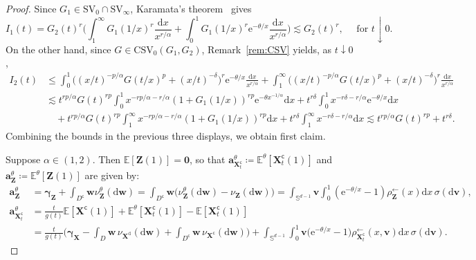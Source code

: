 \documentclass[en,oneside,bbfont,article]{amsart}
\theoremstyle{remark}
\theoremstyle{definition}
\theoremstyle{definition}
\newcommand\Sp{\mathbb{S}}
\newcommand\E{\mathds{E}}
\newcommand\e{\mathord{\mathrm{e}}}
\newcommand\1{\mathds{1}}
\newcommand\SV{\mathrm{SV}}
\newcommand\CSV{\mathrm{CSV}}
\newcommand\da{\downarrow}
\newcommand\la{\leftarrow}
\renewcommand\le{\leqslant}
\newcommand\co{\mathsf{c}}
\newcommand{\D}{\mathrm{d}}
\begin{document}
\begin{proof}
Since $G_1 \in \SV_0\cap\SV_\infty$, Karamata's theorem~\cite[Thm~1.5.11]{MR1015093} gives
\begin{equation*}
I_1(t) = G_2(t)^r\bigg(\int_1^\infty G_1(1/x)^r\frac{\D x}{x^{r/\alpha}}
+\int_0^1 G_1(1/x)^r \e^{-\theta/x} \frac{\D x}{x^{r/\alpha}}\bigg) 
\lesssim G_2(t)^r, \quad \text{ for }t \da 0.
\end{equation*}
On the other hand, since $G \in \CSV_0(G_1,G_2)$, Remark~\ref{rem:CSV} yields, as $t\da 0$,
\begin{align*}
I_2(t) &\le \int_0^1 \big((x/t)^{- p/\alpha}G(t/x)^{p}+(x/t)^{-\delta}\big)^r \e^{-\theta /x} \frac{\D x}{x^{r/\alpha}}  
+ \int_1^\infty \big((x/t)^{-p/\alpha}G(t/x)^{p}+(x/t)^{-\delta}\big)^r \frac{\D x}{x^{r/\alpha}} \\
&\lesssim t^{r p/\alpha}G(t)^{r p}\int_0^1 x^{-r p/\alpha-r/\alpha}(1+G_1(1/x))^{r p}\e^{-\theta x^{-1/\alpha}}\D x+ t^{r\delta}\int_0^1 x^{-r\delta-r/\alpha} \e^{-\theta /x} \D x \\
&\quad + t^{rp/\alpha}G(t)^{rp} \int_1^\infty x^{- rp/\alpha-r/\alpha}(1+G_1(1/x))^{rp} %
\D x + t^{r\delta} \int_1^\infty x^{-r\delta-r/\alpha} \D x
\lesssim %
 t^{rp/\alpha}G(t)^{rp} %
+ t^{r\delta}. %
\end{align*}
Combining the bounds in the previous three displays, we obtain first claim.

Suppose $\alpha\in(1,2)$. Then $\E[\bm{Z}(1)]=\bm{0}$, so that $\bm{a}_{\bm{X}_t^\co}^\theta\coloneqq\E^\theta[\bm{X}_t^\co(1)]$ and $\bm{a}_{\bm{Z}}^\theta\coloneqq\E^\theta[\bm{Z}(1)]$ are given by:
\begin{align*}
\bm{a}_{\bm{Z}}^\theta 
&= \bm{\gamma}_{\bm{Z}}+\int_{D^\co }\bm{w}\nu_{\bm{Z}}^\theta(\D\bm{w})
=\int_{D^\co }\bm{w}\big(\nu_{\bm{Z}}^\theta(\D\bm{w}) - \nu_{\bm{Z}}(\D\bm{w})\big)
=\int_{\Sp^{d-1}}\bm{v}\int_{0}^1
(\e^{-\theta/x}-1)
\rho_{\bm{Z}}^\la(x)
\D x\,\sigma(\D\bm{v}),\\
\bm{a}_{\bm{X}_t^\co}^\theta
&= \frac{t}{g(t)}\E[\bm{X}^\co(1)]
+\E^\theta[\bm{X}_t^\co(1)]-\E[\bm{X}_t^\co(1)]\\
 &= \frac{t}{g(t)}\bigg(\bm{\gamma}_{\bm{X}}
-\int_{D}\bm{w}\,\nu_{\bm{X}^\D}(\D\bm{w})
+ \int_{D^\co }\bm{w}\,\nu_{\bm{X}^\co}(\D\bm{w}) \bigg)
+\int_{\Sp^{d-1}} \int_0^1  %
 \bm{v} \big(\e^{-\theta/x}-1\big)\rho^{\la}_{\bm{X}_t^\co}(x,\bm{v}) %
 \D x\,%
 \sigma(\D \bm{v}).
\end{align*} 


\end{proof}
\end{document}
